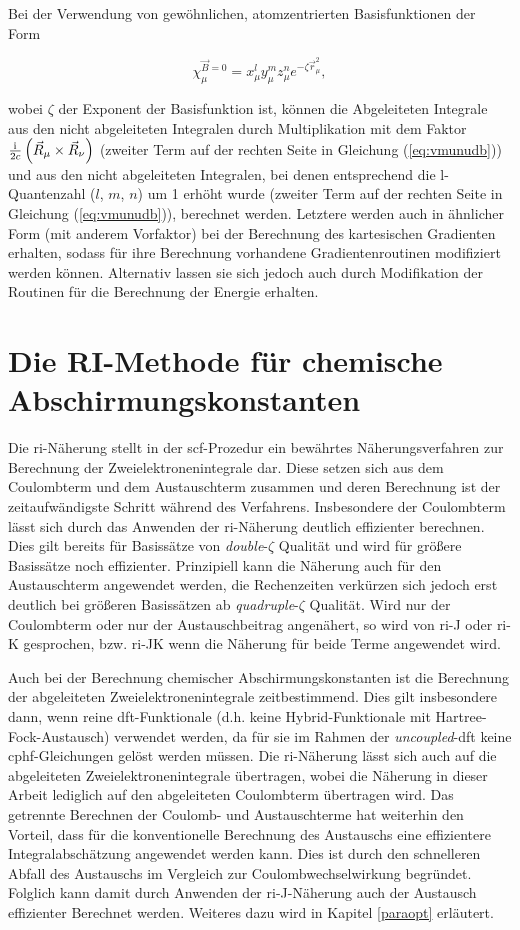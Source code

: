 Bei der Verwendung von gewöhnlichen, atomzentrierten Basisfunktionen der Form

\begin{equation}
\chi_\mu^{\vec{B}=0}=x_\mu^l y_\mu^m z_\mu^n e^{-\zeta\vec{r}_\mu^2},
\end{equation}

wobei $\zeta$ der Exponent der Basisfunktion ist, können die Abgeleiteten Integrale aus den nicht abgeleiteten Integralen durch Multiplikation mit dem Faktor $\frac{\mathrm{i}\mkern1mu}{2c}\left(\vec{R}_\mu\times\vec{R}_\nu\right)$ (zweiter Term auf der rechten Seite in Gleichung (\ref{eq:vmunudb})) und aus den nicht abgeleiteten Integralen, bei denen entsprechend die l-Quantenzahl ($l$, $m$, $n$) um 1 erhöht wurde (zweiter Term auf der rechten Seite in Gleichung (\ref{eq:vmunudb})), berechnet werden. Letztere werden auch in ähnlicher Form (mit anderem Vorfaktor) bei der Berechnung des kartesischen Gradienten erhalten, sodass für ihre Berechnung vorhandene Gradientenroutinen modifiziert werden können. Alternativ lassen sie sich jedoch auch durch Modifikation der Routinen für die Berechnung der Energie erhalten. 

\section{Die RI-Methode für chemische Abschirmungskonstanten}\label{ri}
Die \ac{ri}-Näherung stellt in der \ac{scf}-Prozedur ein bewährtes Näherungsverfahren zur Berechnung der Zweielektronenintegrale dar. Diese setzen sich aus dem Coulombterm und dem Austauschterm zusammen und deren Berechnung ist der zeitaufwändigste Schritt während des Verfahrens. Insbesondere der Coulombterm lässt sich durch das Anwenden der \ac{ri}-Näherung deutlich effizienter berechnen. Dies gilt bereits für Basissätze von \textit{double}-$\zeta$ Qualität und wird für größere Basissätze noch effizienter. Prinzipiell kann die Näherung auch für den Austauschterm angewendet werden, die Rechenzeiten verkürzen sich jedoch erst deutlich bei größeren Basissätzen ab \textit{quadruple}-$\zeta$ Qualität. Wird nur der Coulombterm oder nur der Austauschbeitrag angenähert, so wird von \ac{ri}-J oder \ac{ri}-K gesprochen, bzw. \ac{ri}-JK wenn die Näherung für beide Terme angewendet wird. 

Auch bei der Berechnung chemischer Abschirmungskonstanten ist die Berechnung der abgeleiteten Zweielektronenintegrale zeitbestimmend. Dies gilt insbesondere dann, wenn reine \ac{dft}-Funktionale (d.h. keine Hybrid-Funktionale mit Hartree-Fock-Austausch) verwendet werden, da für sie im Rahmen der \textit{uncoupled}-\ac{dft} keine \ac{cphf}-Gleichungen gelöst werden müssen. Die \ac{ri}-Näherung lässt sich auch auf die abgeleiteten Zweielektronenintegrale übertragen, wobei die Näherung in dieser Arbeit lediglich auf den abgeleiteten Coulombterm übertragen wird. Das getrennte Berechnen der Coulomb- und Austauschterme hat weiterhin den Vorteil, dass für die konventionelle Berechnung des Austauschs eine effizientere Integralabschätzung angewendet werden kann. Dies ist durch den schnelleren Abfall des Austauschs im Vergleich zur Coulombwechselwirkung begründet. Folglich kann damit durch Anwenden der \ac{ri}-J-Näherung auch der Austausch effizienter Berechnet werden. Weiteres dazu wird in Kapitel \ref{paraopt} erläutert. 
